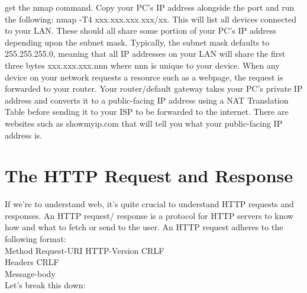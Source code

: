 \documentclass{article}
\begin{document}
get the nmap command. Copy your PC's IP address alongside the port and run the following:
nmap -T4 xxx.xxx.xxx.xxx/xx. This will list all devices connected to your LAN. These should all share some 
portion of your PC's IP address depending upon the subnet mask. Typically, the subnet mask defaults to 
255.255.255.0, meaning that all IP addresses on your LAN will share the first three bytes xxx.xxx.xxx.nnn where 
nnn is unique to your device. When any device on your network requests a resource such as a webpage, the 
request is forwarded to your router. Your router/default gateway takes your PC's private IP address and 
converts it to a public-facing IP address using a NAT Translation Table before sending it to your ISP to be 
forwarded to the internet. There are websites such as showmyip.com that will tell you what your public-facing 
IP address is. 

\section{The HTTP Request and Response}

If we're to understand web, it's quite crucial to understand HTTP requests and responses. An HTTP request/
response is a protocol for HTTP servers to know how and what to fetch or send to the user. An HTTP request 
adheres to the following format:\\

Method Request-URI HTTP-Version CRLF\\
Headers CRLF\\
Message-body\\

Let's break this down:\\
\end{document}
